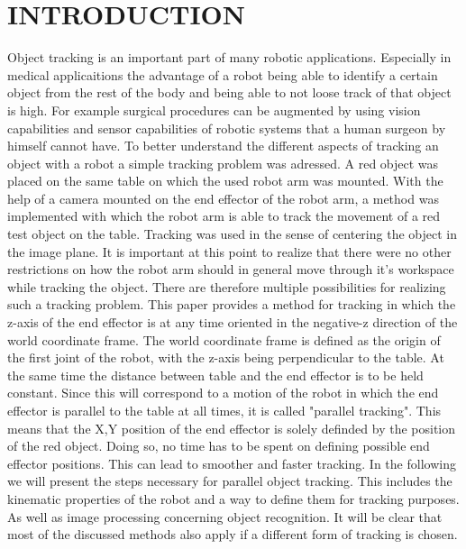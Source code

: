\documentclass[letterpaper, 10 pt, conference]{ieeeconf}  %
\begin{document}
\section{INTRODUCTION}
Object tracking is an important part of many robotic applications. Especially in medical applicaitions the advantage of a robot being able to identify a certain object from the rest of the body and being able to not loose track of that object is high. For example surgical procedures can be augmented by using vision capabilities and sensor capabilities of robotic systems that a human surgeon by himself cannot have. To better understand the different aspects of tracking an object with a robot a simple tracking problem was adressed. A red object was placed on the same table on which the used robot arm was mounted. With the help of a camera mounted on the end effector of the robot arm, a method was implemented with which the robot arm is able to track the movement of a red test object on the table. Tracking was used in the sense of centering the object in the image plane. It is important at this point to realize that there were no other restrictions on how the robot arm should in general move through it's workspace while tracking the object. There are therefore multiple possibilities for realizing such a tracking problem. This paper provides a method for tracking in which the z-axis of the end effector is at any time oriented in the negative-z direction of the world coordinate frame. The world coordinate frame is defined as the origin of the first joint of the robot, with the z-axis being perpendicular to the table. At the same time the distance between table and the end effector is to be held constant. Since this will correspond to a motion of the robot in which the end effector is parallel to the table at all times, it is called "parallel tracking". This means that the X,Y position of the end effector is solely definded by the position of the red object. Doing so, no time has to be spent on defining possible end effector positions. This can lead to smoother and faster tracking. In the following we will present the steps necessary for parallel object tracking. This includes the kinematic properties of the robot and a way to define them for tracking purposes. As well as image processing concerning object recognition. It will be clear that most of the discussed methods also apply if a different form of tracking is chosen.

\end{document}
